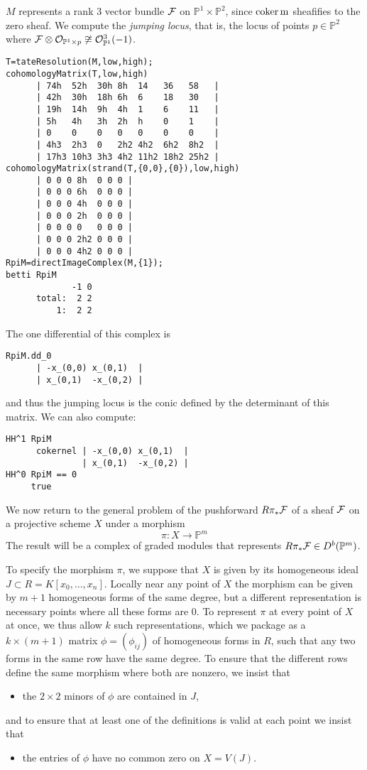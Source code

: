\documentclass[twoside,12pt, leqno]{amsart}
\def\PP{{\mathbb P}}
\begin{document}
 \noindent
$M$ represents a rank 3 vector bundle ${\mathcal F}$ on $\PP^1\times \PP^2$, since  ${\rm{coker}\,} \rm m$ sheafifies to the zero sheaf. We compute the \emph{jumping locus},  that is, the locus of points $p \in \PP^2$ where $\sF\otimes \sO_{\PP^1\times p} \not\cong \sO_{\PP^1}^3(-1)$.
{\small \begin{verbatim}
T=tateResolution(M,low,high); 
cohomologyMatrix(T,low,high)
      | 74h  52h  30h 8h  14   36   58   |
      | 42h  30h  18h 6h  6    18   30   |
      | 19h  14h  9h  4h  1    6    11   |
      | 5h   4h   3h  2h  h    0    1    |
      | 0    0    0   0   0    0    0    |
      | 4h3  2h3  0   2h2 4h2  6h2  8h2  |
      | 17h3 10h3 3h3 4h2 11h2 18h2 25h2 |
cohomologyMatrix(strand(T,{0,0},{0}),low,high)
      | 0 0 0 8h  0 0 0 |
      | 0 0 0 6h  0 0 0 |
      | 0 0 0 4h  0 0 0 |
      | 0 0 0 2h  0 0 0 |
      | 0 0 0 0   0 0 0 |
      | 0 0 0 2h2 0 0 0 |
      | 0 0 0 4h2 0 0 0 | 
RpiM=directImageComplex(M,{1});
betti RpiM
             -1 0
      total:  2 2
          1:  2 2
\end{verbatim}
\noindent The one differential of this complex is
\begin{verbatim}
RpiM.dd_0
      | -x_(0,0) x_(0,1)  |
      | x_(0,1)  -x_(0,2) |
\end{verbatim}
\noindent and thus the jumping locus is the conic defined by the determinant of this matrix. We can also compute:
\begin{verbatim}
HH^1 RpiM
      cokernel | -x_(0,0) x_(0,1)  |
               | x_(0,1)  -x_(0,2) |
HH^0 RpiM == 0 
     true 
 \end{verbatim}}

We now return to the general problem of the pushforward $R\pi_* {\mathcal F}$ of a sheaf ${\mathcal F}$ on a projective scheme $X$ under a morphism 
$$
\pi \colon X \to \PP^m
$$
The result will be a complex of graded modules that represents
$R\pi_* \sF \in D^b(\PP^m)$.

To specify the morphism $\pi$, we suppose that $X$ is given by its homogeneous ideal $J \subset R = K[x_0,\ldots,x_n]$. Locally near any point of $X$ the morphism can be given by $m+1$ homogeneous
forms of the same degree, but a different representation is necessary points where all these forms are 0. To represent $\pi$
at every point of $X$ at once, we thus allow $k$ such representations, which we package as a
 $k \times (m+1)$ matrix $\phi=(\phi_{ij})$ of homogeneous forms in $R$, such that any two forms
 in the same row have the same degree. To ensure that the different rows define the same
 morphism where both are nonzero, we insist that
 \begin{itemize}
\item the $2\times 2$ minors of $\phi$ are contained in $J$,
\end{itemize}
and to ensure that at least one of the definitions is valid at each point we insist that
\begin{itemize}
\item the entries of $\phi$ have no common zero on $X=V(J)$.
\end{itemize}
\end{document}
